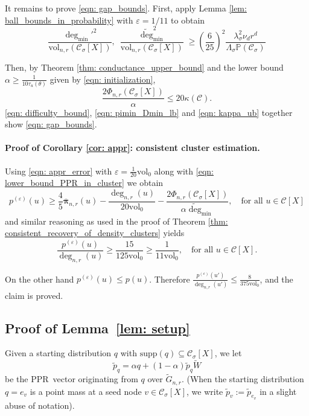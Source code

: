 \documentclass[11pt,twoside]{article}
\newcommand{\vol}{\mathrm{vol}}
\newcommand{\1}{\mathbf{1}}
\newcommand{\pbf}{p}        %
\newcommand{\pibf}{\bm{\pi}}
\newcommand{\Xbf}{X}             %
\newcommand{\Wbf}{W}
\newcommand{\Pbb}{\mathbb{P}}
\newcommand{\Cset}{\mathcal{C}}
\newcommand{\Csig}{\Cset_{\sigma}}
\newcommand{\degminpr}{\deg_{\min}'}
\newcommand{\degminwt}{\widetilde{\deg}_{\min}}
\newcommand{\pprspace}{{\sc PPR~}}
\begin{document}
It remains to prove \eqref{eqn: gap_bounds}. First, apply Lemma \ref{lem: ball_bounds_in_probability} with $\varepsilon = 1/11$ to obtain
\begin{equation}
\label{eqn: pimin_Dmin_lb}
\frac{\degminpr^2}{\vol_{n,r}(\Csig[\Xbf])},~ \frac{\degminwt^2}{\vol_{n,r}(\Csig[\Xbf])} \geq \left(\frac{6}{25}\right)^2 \frac{\lambda_{\sigma}^2 \nu_d r^d}{\Lambda_{\sigma}\Pbb(\Csig)}  
\end{equation}

Then, by Theorem \ref{thm: conductance_upper_bound} and the lower bound $\alpha \geq \frac{1}{10 \tau_{u}(\theta)}$ given by \eqref{eqn: initialization},
\begin{equation}
\label{eqn: difficulty_bound}
\frac{2\Phi_{n,r}(\Csig[\Xbf])}{\alpha} \leq 20\kappa(\Cset).
\end{equation}
\eqref{eqn: difficulty_bound}, \eqref{eqn: pimin_Dmin_lb} and \eqref{eqn: kappa_ub} together show \eqref{eqn: gap_bounds}.

\paragraph{Proof of Corollary \ref{cor: appr}: consistent cluster estimation.}

Using \eqref{eqn: appr_error} with $\varepsilon = \frac{1}{20}\vol_0$ along with \eqref{eqn: lower_bound_PPR_in_cluster} we obtain
\begin{equation*}
\pbf^{(\varepsilon)}(u) \geq \frac{4}{5} \overline{\pibf}_{n,r}(u) - \frac{\deg_{n,r}(u)}{20\vol_0} - \frac{2\Phi_{n,r}(\Csig[\Xbf])}{\alpha \degminwt}, \quad \textrm{for all $u \in \Cset[\Xbf]$}
\end{equation*}
and similar reasoning as used in the proof of Theorem \ref{thm: consistent_recovery_of_density_clusters} yields
\begin{equation*}
\frac{\pbf^{(\varepsilon)}(u)}{\deg_{n,r}(u)} \geq \frac{15}{125\vol_0} \geq \frac{1}{11 \vol_0}, \quad \textrm{for all $u \in \Cset[\Xbf]$}.
\end{equation*}

On the other hand $\pbf^{(\varepsilon)}(u) \leq \pbf(u)$. Therefore $\frac{\pbf^{(\varepsilon)}(u')}{\deg_{n,r}(u')} \leq \frac{8}{375\vol_0}$, and the claim is proved.

\subsection{Proof of Lemma~\ref{lem: setup}}
	Given a starting distribution $q$ with $\mathrm{supp}(q) \subseteq \Csig[\Xbf]$, we let
	\begin{equation}
	\widetilde{\pbf}_q = \alpha q + (1 - \alpha) \widetilde{\pbf}_{q} \widetilde{\Wbf}
	\end{equation}
	be the \pprspace vector originating from $q$ over $\widetilde{G}_{n,r}$. (When the starting distribution $q = e_v$ is a point mass at a seed node $v \in \Csig[\Xbf]$, we write $\widetilde{\pbf}_v := \widetilde{\pbf}_{e_v}$ in a slight abuse of notation).
	
\end{document}
